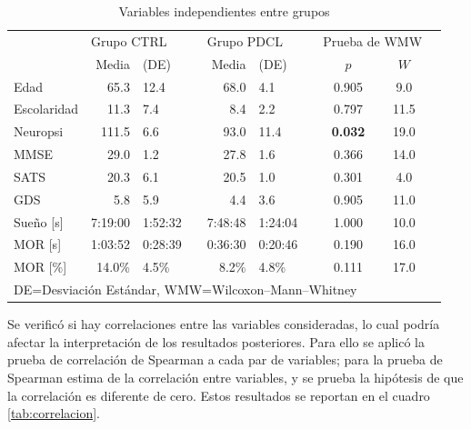\begin{table}
\centering
\caption{Variables independientes entre grupos}
\begin{tabular}{lrlcrlcccr}
\toprule
 & \multicolumn{2}{l}{Grupo CTRL} & \phantom{.} & \multicolumn{2}{l}{Grupo PDCL} 
 & \phantom{.} & \multicolumn{2}{l}{Prueba de WMW}
 \\
\cmidrule{2-3} \cmidrule{5-6} \cmidrule{8-9}
& Media & (DE) & & Media & (DE) & & $p$ & $W$ \\
\midrule
Edad          & 65.3     & 12.4     &      & 68.0     & 4.1      &        & 0.905 & 9.0  \\
Escolaridad   & 11.3     & 7.4      &      & 8.4      & 2.2      &        & 0.797 & 11.5 \\
Neuropsi      & 111.5    & 6.6      &      & 93.0     & 11.4     &        &\bf 0.032 & 19.0 \\
MMSE          & 29.0     & 1.2      &      & 27.8     & 1.6      &        & 0.366 & 14.0 \\
SATS          & 20.3     & 6.1      &      & 20.5     & 1.0      &        & 0.301 & 4.0  \\
GDS           & 5.8      & 5.9      &      & 4.4      & 3.6      &        & 0.905 & 11.0 \\
Sueño {[}s{]} & 7:19:00  & 1:52:32  &      & 7:48:48  & 1:24:04  &        & 1.000 & 10.0 \\
MOR {[}s{]}   & 1:03:52  & 0:28:39  &      & 0:36:30  & 0:20:46  &        & 0.190 & 16.0 \\
MOR {[}\%{]}  & 14.0\%   & 4.5\%    &      & 8.2\%    & 4.8\%    &        & 0.111 & 17.0 \\
\bottomrule 
\multicolumn{8}{l}{DE=Desviación Estándar, WMW=Wilcoxon--Mann--Whitney}
\end{tabular} 
\label{tab:var_wilcox}
\end{table}



Se verificó si hay correlaciones entre las variables consideradas, lo cual podría afectar la interpretación de los resultados posteriores.
%
Para ello se aplicó la prueba de correlación de Spearman a cada par de variables; para la prueba de Spearman estima de la correlación entre variables, y se prueba la hipótesis de que la correlación es diferente de cero.
%
Estos resultados se reportan en el cuadro \ref{tab:correlacion}.


